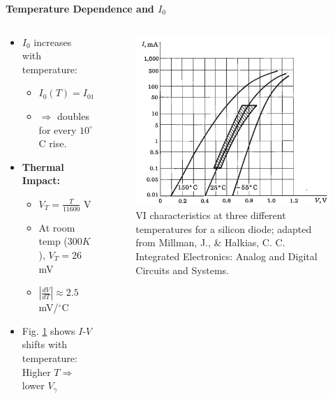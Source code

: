 \begin{frame}{\textbf{Temperature Dependence and $I_0$}}
	\begin{columns}
		\begin{column}{0.5\textwidth}
    \begin{itemize}
        \item $I_0$ increases with temperature:
        \begin{itemize}
            \item $I_0(T) = I_{01} \times 2^{(T - T_1)/10}$
            \item $\Rightarrow$ doubles for every $10^\circ$C rise.
        \end{itemize}
        \item \textbf{Thermal Impact:}
        \begin{itemize}
            \item $V_T = \frac{T}{11600}$ V
            \item At room temp ($300K$), $V_T = 26$ mV
            \item $\left|\frac{dV}{dT}\right| \approx 2.5$ mV/$^\circ$C
        \end{itemize}
        \item Fig. \ref{fig:temp_Si_diode_characteristics} shows $I$-$V$ shifts with temperature: Higher $T \Rightarrow$ lower $V_\gamma$
    \end{itemize}
\end{column}
\begin{column}{0.5\textwidth}
	\begin{figure}
		\centering
		\includegraphics[scale=0.225]{fig/lec03/Temp_dependance.png}
		\caption{VI characteristics at three different	temperatures for a silicon
		diode; adapted from Millman, J., \& Halkias, C. C. Integrated Electronics: Analog and Digital Circuits and Systems.}
		\label{fig:temp_Si_diode_characteristics}
	\end{figure}
	\end{column}
	\end{columns}
\end{frame}

